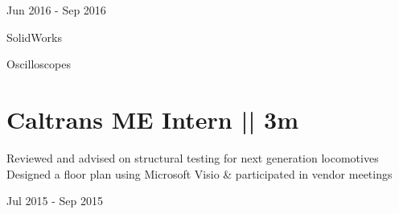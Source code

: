 \documentclass[letterpaper,10pt,oneside]{article}
\begin{document}
\begin{body}
\begin{subtitle}
\vspace{-7.8ex}
{{Jun 2016 - Sep 2016}}
\end{subtitle}
\vspace{0ex}

{
\vspace{0.5ex}
\color{cyan}\small
{SolidWorks} %
}

{
\vspace{-2.5ex}\hspace{3.17in}
\color{cyan}\small
{Oscilloscopes} %
}
\vspace{-1.5ex}



\section
{\textbf{Caltrans}
\newline
ME Intern || 3m
\newline
}

\BulletItem
\vspace{-2.5ex}
\begin{detail}
\BulletItem
Reviewed and advised on structural testing for next generation locomotives
\BulletItem
Designed a floor plan using Microsoft Visio \& participated in vendor meetings
\end{detail}

\begin{subtitle}
\vspace{-7.8ex}
{{Jul 2015 - Sep 2015}}
\end{subtitle}
\vspace{3ex}




\end{body}

\end{document}
